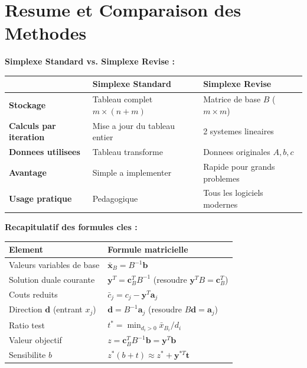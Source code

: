 \documentclass[12pt,a4paper]{article}
\begin{document}
\newpage
\section{Resume et Comparaison des Methodes}

\begin{important}
\textbf{Simplexe Standard vs. Simplexe Revise :}

\begin{center}
\begin{tabular}{l|p{5cm}|p{5cm}}
\toprule
& \textbf{Simplexe Standard} & \textbf{Simplexe Revise} \\
\midrule
\textbf{Stockage} & Tableau complet $m \times (n+m)$ & Matrice de base $B$ ($m \times m$) \\
\textbf{Calculs par iteration} & Mise a jour du tableau entier & 2 systemes lineaires \\
\textbf{Donnees utilisees} & Tableau transforme & Donnees originales $A, b, c$ \\
\textbf{Avantage} & Simple a implementer & Rapide pour grands problemes \\
\textbf{Usage pratique} & Pedagogique & Tous les logiciels modernes \\
\bottomrule
\end{tabular}
\end{center}
\end{important}

\begin{astuce}
\textbf{Recapitulatif des formules cles :}

\begin{center}
\begin{tabular}{l|l}
\toprule
\textbf{Element} & \textbf{Formule matricielle} \\
\midrule
Valeurs variables de base & $\bar{\mathbf{x}}_B = B^{-1}\mathbf{b}$ \\
Solution duale courante & $\mathbf{y}^T = \mathbf{c}_B^T B^{-1}$ (resoudre $\mathbf{y}^T B = \mathbf{c}_B^T$) \\
Couts reduits & $\bar{c}_j = c_j - \mathbf{y}^T \mathbf{a}_j$ \\
Direction $\mathbf{d}$ (entrant $x_j$) & $\mathbf{d} = B^{-1}\mathbf{a}_j$ (resoudre $B\mathbf{d} = \mathbf{a}_j$) \\
Ratio test & $t^* = \min_{d_i > 0} \bar{x}_{B_i}/d_i$ \\
Valeur objectif & $z = \mathbf{c}_B^T B^{-1}\mathbf{b} = \mathbf{y}^T \mathbf{b}$ \\
Sensibilite $b$ & $z^*(b + t) \approx z^* + \mathbf{y}^{*T} \mathbf{t}$ \\
\bottomrule
\end{tabular}
\end{center}
\end{astuce}
\end{document}
